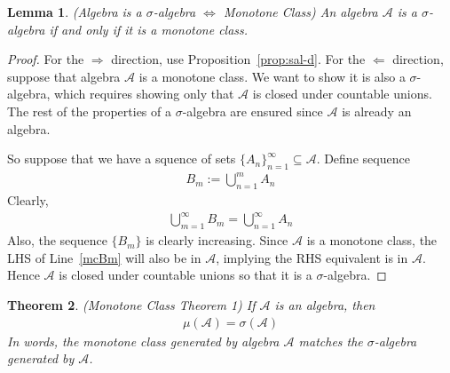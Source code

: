 \documentclass[12pt]{article}
\theoremstyle{plain}
\newtheorem{thm}{Theorem}[section]
\newtheorem{lem}[thm]{Lemma}
\theoremstyle{definition}
\theoremstyle{remark}
\newcommand{\sA}{\mathscr{A}}
\newcommand{\ninf}{_{n=1}^\infty}
\newcommand{\minf}{_{m=1}^\infty}
\begin{document}
\begin{lem}\emph{(Algebra is a $\sigma$-algebra $\iff$ Monotone Class)}
An algebra $\sA$ is a $\sigma$-algebra if and only if it is a monotone
class.
\end{lem}
\begin{proof}
For the $\Rightarrow$ direction, use Proposition~\ref{prop:sal-d}.
For the $\Leftarrow$ direction, suppose that algebra $\sA$ is a
monotone class. We want to show it is also a $\sigma$-algebra, which
requires showing only that $\sA$ is closed under countable unions. The
rest of the properties of a $\sigma$-algebra are ensured since $\sA$ is
already an algebra.

So suppose that we have a squence of sets
$\{A_n\}\ninf\subseteq\sA$. Define sequence
\begin{align*}
  B_m := \bigcup_{n=1}^m A_n
\end{align*}
Clearly,
\begin{align}
  \bigcup\minf B_m = \bigcup\ninf A_n
  \label{mcBm}
\end{align}
Also, the sequence $\{B_m\}$ is clearly increasing. Since $\sA$ is a
monotone class, the LHS of Line~\ref{mcBm} will also be in $\sA$,
implying the RHS equivalent is in $\sA$. Hence $\sA$ is closed under
countable unions so that it is a $\sigma$-algebra.
\end{proof}

\begin{thm}\emph{(Monotone Class Theorem 1)}
\label{thm:mct-1}
If $\sA$ is an algebra, then
\begin{align*}
  \mu(\sA) = \sigma(\sA)
\end{align*}
In words, the monotone class generated by algebra $\sA$ matches the
$\sigma$-algebra generated by $\sA$.
\end{thm}
\end{document}
